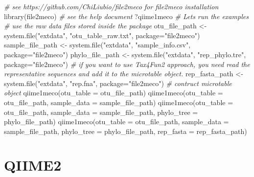 \documentclass[
]{book}
\newenvironment{Shaded}{\begin{snugshade}}{\end{snugshade}}
\newcommand{\AttributeTok}[1]{\textcolor[rgb]{0.77,0.63,0.00}{#1}}
\newcommand{\CommentTok}[1]{\textcolor[rgb]{0.56,0.35,0.01}{\textit{#1}}}
\newcommand{\FunctionTok}[1]{\textcolor[rgb]{0.00,0.00,0.00}{#1}}
\newcommand{\NormalTok}[1]{#1}
\newcommand{\OtherTok}[1]{\textcolor[rgb]{0.56,0.35,0.01}{#1}}
\newcommand{\StringTok}[1]{\textcolor[rgb]{0.31,0.60,0.02}{#1}}
\begin{document}
\begin{Shaded}
\begin{Highlighting}[]
\CommentTok{\# see https://github.com/ChiLiubio/file2meco for file2meco installation}
\FunctionTok{library}\NormalTok{(file2meco)}
\CommentTok{\# see the help document}
\NormalTok{?qiime1meco}
\CommentTok{\# Let\textquotesingle{}s run the examples}
\CommentTok{\# use the raw data files stored inside the package}
\NormalTok{otu\_file\_path }\OtherTok{\textless{}{-}} \FunctionTok{system.file}\NormalTok{(}\StringTok{"extdata"}\NormalTok{, }\StringTok{"otu\_table\_raw.txt"}\NormalTok{, }\AttributeTok{package=}\StringTok{"file2meco"}\NormalTok{)}
\NormalTok{sample\_file\_path }\OtherTok{\textless{}{-}} \FunctionTok{system.file}\NormalTok{(}\StringTok{"extdata"}\NormalTok{, }\StringTok{"sample\_info.csv"}\NormalTok{, }\AttributeTok{package=}\StringTok{"file2meco"}\NormalTok{)}
\NormalTok{phylo\_file\_path }\OtherTok{\textless{}{-}} \FunctionTok{system.file}\NormalTok{(}\StringTok{"extdata"}\NormalTok{, }\StringTok{"rep\_phylo.tre"}\NormalTok{, }\AttributeTok{package=}\StringTok{"file2meco"}\NormalTok{)}
\CommentTok{\# if you want to use Tax4Fun2 approach, you need read the representative sequences and add it to the microtable object.}
\NormalTok{rep\_fasta\_path }\OtherTok{\textless{}{-}} \FunctionTok{system.file}\NormalTok{(}\StringTok{"extdata"}\NormalTok{, }\StringTok{"rep.fna"}\NormalTok{, }\AttributeTok{package=}\StringTok{"file2meco"}\NormalTok{)}
\CommentTok{\# contruct microtable object}
\FunctionTok{qiime1meco}\NormalTok{(}\AttributeTok{otu\_table =}\NormalTok{ otu\_file\_path)}
\FunctionTok{qiime1meco}\NormalTok{(}\AttributeTok{otu\_table =}\NormalTok{ otu\_file\_path, }\AttributeTok{sample\_data =}\NormalTok{ sample\_file\_path)}
\FunctionTok{qiime1meco}\NormalTok{(}\AttributeTok{otu\_table =}\NormalTok{ otu\_file\_path, }\AttributeTok{sample\_data =}\NormalTok{ sample\_file\_path, }\AttributeTok{phylo\_tree =}\NormalTok{ phylo\_file\_path)}
\FunctionTok{qiime1meco}\NormalTok{(}\AttributeTok{otu\_table =}\NormalTok{ otu\_file\_path, }\AttributeTok{sample\_data =}\NormalTok{ sample\_file\_path, }\AttributeTok{phylo\_tree =}\NormalTok{ phylo\_file\_path, }\AttributeTok{rep\_fasta =}\NormalTok{ rep\_fasta\_path)}
\end{Highlighting}
\end{Shaded}

\hypertarget{qiime2}{%
\section{QIIME2}\label{qiime2}}
\end{document}
